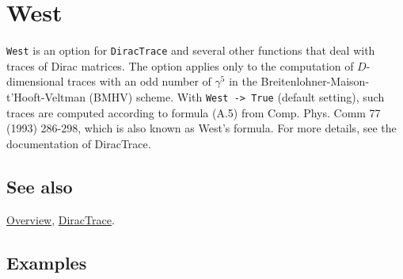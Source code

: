 \documentclass[../FeynCalcManual.tex]{subfiles}
\begin{document}
\hypertarget{west}{
\section{West}\label{west}}

\texttt{West} is an option for \texttt{DiracTrace} and several other
functions that deal with traces of Dirac matrices. The option applies
only to the computation of \(D\)-dimensional traces with an odd number
of \(\gamma ^5\) in the Breitenlohner-Maison-t'Hooft-Veltman (BMHV)
scheme. With \texttt{West -> True} (default setting), such traces are
computed according to formula (A.5) from Comp. Phys. Comm 77 (1993)
286-298, which is also known as West's formula. For more details, see
the documentation of DiracTrace.

\subsection{See also}

\hyperlink{toc}{Overview}, \hyperlink{diractrace}{DiracTrace}.

\subsection{Examples}
\end{document}
